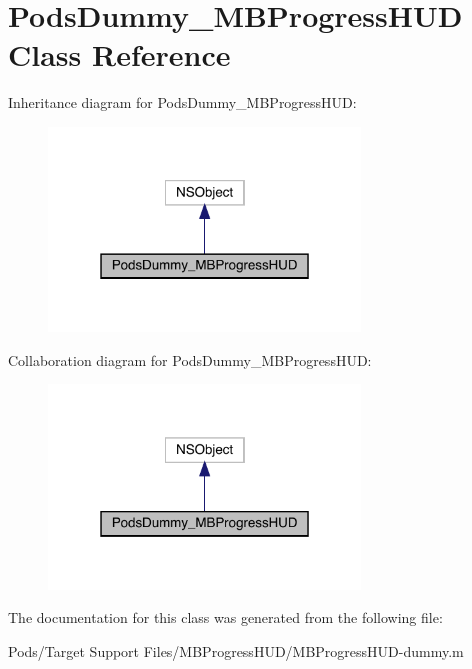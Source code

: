 \hypertarget{interface_pods_dummy___m_b_progress_h_u_d}{}\section{Pods\+Dummy\+\_\+\+M\+B\+Progress\+H\+UD Class Reference}
\label{interface_pods_dummy___m_b_progress_h_u_d}


Inheritance diagram for Pods\+Dummy\+\_\+\+M\+B\+Progress\+H\+UD\+:\nopagebreak
\begin{figure}[H]
\begin{center}
\leavevmode
\includegraphics[width=235pt]{interface_pods_dummy___m_b_progress_h_u_d__inherit__graph}
\end{center}
\end{figure}


Collaboration diagram for Pods\+Dummy\+\_\+\+M\+B\+Progress\+H\+UD\+:\nopagebreak
\begin{figure}[H]
\begin{center}
\leavevmode
\includegraphics[width=235pt]{interface_pods_dummy___m_b_progress_h_u_d__coll__graph}
\end{center}
\end{figure}


The documentation for this class was generated from the following file\+:\begin{DoxyCompactItemize}
\item 
Pods/\+Target Support Files/\+M\+B\+Progress\+H\+U\+D/M\+B\+Progress\+H\+U\+D-\/dummy.\+m\end{DoxyCompactItemize}

